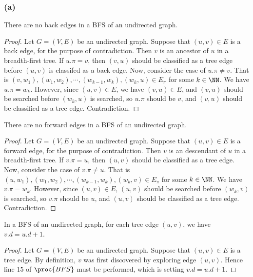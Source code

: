 \subsubsection*{(a)}

\begin{claim}
    There are no back edges in a BFS of an undirected graph.
\end{claim}

\begin{proof}
    Let $G = (V,E)$ be an undirected graph.
    Suppose that $(u,v) \in E$ is a back edge, for the purpose of contradiction.
    Then $v$ is an ancestor of $u$ in a breadth-first tree.
    If $u.\pi = v$, then $(v,u)$ should be classified as a tree edge
    before $(u,v)$ is classifed as a back edge.
    Now, consider the case of $u.\pi \neq v$.
    That is $(v,w_1), (w_1,w_2), \cdots, (w_{k-1},w_k), (w_k, u) \in E_\pi$
    for some $k \in \NN$.
    We have $u.\pi = w_k$.
    However, since $(u,v) \in E$, we have $(v,u) \in E$,
    and $(v,u)$ should be searched before $(w_k, u)$ is searched,
    so $u.\pi$ should be $v$, and $(v,u)$ should be classified as a tree edge.
    Contradiction.
\end{proof}

\begin{claim}
    There are no forward edges in a BFS of an undirected graph.
\end{claim}

\begin{proof}
    Let $G = (V,E)$ be an undirected graph.
    Suppose that $(u,v) \in E$ is a forward edge, for the purpose of contradiction.
    Then $v$ is an descendant of $u$ in a breadth-first tree.
    If $v.\pi = u$, then $(u,v)$ should be classified as a tree edge.
    Now, consider the case of $v.\pi \neq u$.
    That is $(u,w_1), (w_1,w_2), \cdots, (w_{k-1},w_k), (w_k, v) \in E_\pi$
    for some $k \in \NN$.
    We have $v.\pi = w_k$.
    However, since $(u,v) \in E$,
    $(u,v)$ should be searched before $(w_k, v)$ is searched,
    so $v.\pi$ should be $u$, and $(u,v)$ should be classified as a tree edge.
    Contradiction.
\end{proof}

\begin{claim}
    In a BFS of an undirected graph,
    for each tree edge $(u,v)$, we have $v.d=u.d+1$.
\end{claim}

\begin{proof}
    Let $G = (V,E)$ be an undirected graph.
    Suppose that $(u,v) \in E$ is a tree edge.
    By definition, $v$ was first discovered by exploring edge $(u,v)$.
    Hence line 15 of $\proc{BFS}$ must be performed,
    which is setting $v.d = u.d + 1$.
\end{proof}

